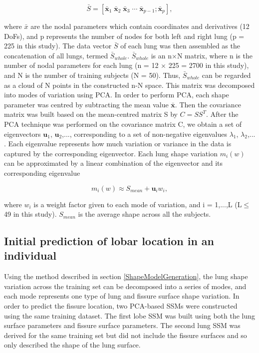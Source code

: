\documentclass[]{spie}  %
\begin{document}
{\begin{equation}
 \label{eq:PCAConstruction2}
 \bar{S} = [\mathbf{\bar{x}}_1 \; \mathbf{\bar{x}}_2 \; \mathbf{\bar{x}}_3 \; \cdots \; \mathbf{\bar{x}}_{p-1}; \mathbf{\bar{x}}_p],
\end{equation}

\noindent where $\bar{x}$ are the nodal parameters which contain coordinates and derivatives (12 DoFs), and p represents the number of nodes for both left and right lung (p = 225 in this study). The data vector $\bar{S}$ of each lung was then assembled as the concatenation of all lungs, termed $\bar{S}_{whole}$. $\bar{S}_{whole}$ is an n$\times$N matrix, where n is the number of nodal parameters for each lung (n = 12 $\times$ 225 = 2700 in this study), and N is the number of training subjects (N = 50). Thus, $\bar{S}_{whole}$ can be regarded as a cloud of N points in the constructed n-N space. This matrix was decomposed into modes of variation using PCA. In order to perform PCA, each shape parameter was centred by subtracting the mean value $\mathbf{\bar{x}}$. Then the covariance matrix was built based on the mean-centred matrix S by $C = SS^T$. After the PCA technique was performed on the covariance matrix C, we obtain a set of eigenvectors $\mathbf{u}_1$, $\mathbf{u}_2$,..., corresponding to a set of non-negative eigenvalues $\lambda_1$, $\lambda_2$,... . Each eigenvalue represents how much variation or variance in the data is captured by the corresponding eigenvector. Each lung shape variation $m_i(w)$ can be approximated by a linear combination of the eigenvector and its corresponding eigenvalue

\begin{equation}
 \label{eq:PCAConstruction3}
 m_i(w) \approx S_{mean} + \mathbf{u}_i w_i,
\end{equation}

\noindent where $w_i$ is a weight factor given to each mode of variation, and i = 1,...,L (L$\leq$ 49 in this study). $S_{mean}$ is the average shape across all the subjects.

\subsection{Initial prediction of lobar location in an individual} \label{MeshPrediction}
Using the method described in section \ref{ShapeModelGeneration}, the lung shape variation across the training set can be decomposed into a series of modes, and each mode represents one type of lung and fissure surface shape variation. In order to predict the fissure location, two PCA-based SSMs were constructed using the same training dataset. The first lobe SSM was built using both the lung surface parameters and fissure surface parameters. The second lung SSM was derived for the same training set but did not include the fissure surfaces and so only described the shape of the lung surface.

}
\end{document}
